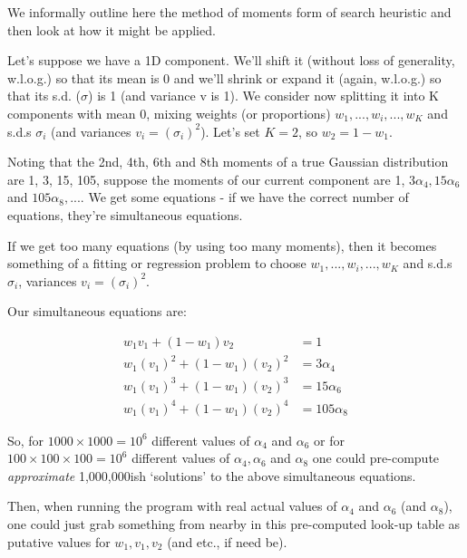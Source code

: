 \documentclass{elsarticle}
\begin{document}
We informally outline here the method of moments form of search heuristic and then look at how it might be applied.

Let's suppose we have a 1D component.  We'll shift it (without loss of generality, w.l.o.g.) so that its mean is 0 and we'll shrink or expand it (again, w.l.o.g.) so that its s.d. ($\sigma$) is 1 (and variance v is 1).
We consider now splitting it into K components with mean 0,
mixing weights (or proportions) $w_1, ..., w_i, ..., w_K$ and s.d.s $\sigma_i$ (and variances $v_i = (\sigma_i)^2$).
Let's set $K = 2$, so $w_2 = 1 - w_1$.

Noting that the 2nd, 4th, 6th and 8th moments of a true Gaussian distribution are 1, 3, 15, 105,
suppose the moments of our current component are 1, $3 \alpha_4, 15 \alpha_6$ and $105 \alpha_8, ... $.
We get some equations - if we have the correct number of equations,
they're simultaneous equations.

If we get too many equations (by using too many moments), then it
becomes something of a fitting or regression problem to choose
$w_1, ..., w_i, ..., w_K$ and s.d.s $\sigma_i$, variances $v_i = (\sigma_i)^2$.

Our simultaneous equations are:

\begin{align*}
w_1 v_1       + (1 - w_1) v_2       &=    1\\
w_1 (v_1)^2  + (1 - w_1) (v_2)^2  &=    3 \alpha_4\\
w_1 (v_1)^3  + (1 - w_1) (v_2)^3  &=   15 \alpha_6\\
w_1 (v_1)^4  + (1 - w_1) (v_2)^4  &=  105 \alpha_8
\end{align*}


So, for $1000 \times 1000 = 10^6$ different values of $\alpha_4$ and $\alpha_6$
or for $100 \times 100 \times 100 = 10^6$ different values of $\alpha_4, \alpha_6$ and $\alpha_8$
one could pre-compute {\em approximate} 1,000,000ish `solutions' to the above simultaneous equations.

Then, when running the program with real actual values of $\alpha_4$ and $\alpha_6$ (and $\alpha_8$),
one could just grab something from nearby in this pre-computed look-up table
as putative values for $w_1, v_1, v_2$ (and etc., if need be).
\end{document}
